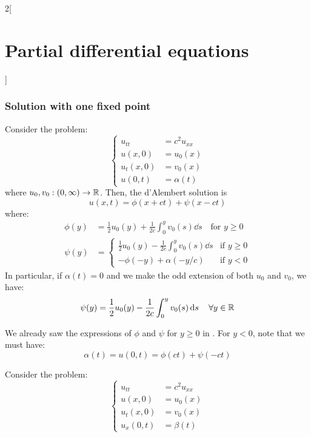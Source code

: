 \documentclass[../../../main_math.tex]{subfiles}
\begin{document}
\begin{multicols}{2}[\section{Partial differential equations}]
  \subsubsection{Solution with one fixed point}
  \begin{proposition}\label{PDE:wave1fixed}
    Consider the problem:
    $$
      \left\{
      \begin{aligned}
        u_{tt}   & =c^2u_{xx} \\
        u(x,0)   & =u_0(x)    \\
        u_t(x,0) & =v_0(x)    \\
        u(0,t)   & =\alpha(t)
      \end{aligned}
      \right.
    $$
    where $u_0,v_0:(0,\infty)\rightarrow\mathbb{R}$.
    Then, the d'Alembert solution is $$u(x,t)=\phi(x+ct)+\psi(x-ct)$$ where:
    \begin{align*}
      \phi(y) & =\frac{1}{2}u_0(y)+\frac{1}{2c}\int_0^yv_0(s)\dd{s}\quad\text{for }y\geq 0 \\
      \psi(y) & =
      \begin{cases}
        \displaystyle\frac{1}{2}u_0(y)-\frac{1}{2c}\int_0^yv_0(s)\dd{s} & \text{if } y\geq 0 \\
        \displaystyle -\phi(-y)+\alpha(-y/c)                            & \text{if } y< 0
      \end{cases}
    \end{align*}
    In particular, if $\alpha(t)=0$ and we make the odd extension of both $u_0$ and $v_0$, we have:
    \begin{equation*}
      \psi(y) =\frac{1}{2}u_0(y)-\frac{1}{2c}\int_0^yv_0(s)\dd{s} \quad\forall y\in\mathbb{R}
    \end{equation*}
  \end{proposition}
  \begin{sproof}
    We already saw the expressions of $\phi$ and $\psi$ for $y\geq 0$ in . For $y<0$, note that we must have: $$\alpha(t)=u(0,t)=\phi(ct)+\psi(-ct)$$
  \end{sproof}
  \begin{proposition}
    Consider the problem:
    $$
      \left\{
      \begin{aligned}
        u_{tt}   & =c^2u_{xx} \\
        u(x,0)   & =u_0(x)    \\
        u_t(x,0) & =v_0(x)    \\
        u_x(0,t) & =\beta(t)
      \end{aligned}
$$
\end{proposition}
\end{multicols}
\end{document}
